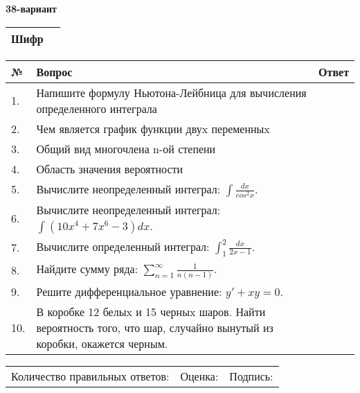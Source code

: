 \documentclass{article}
\begin{document}
  \egroup
  
  \newpage
  
  
  \textbf{38-вариант}\\
  
  \bgroup
  \def\arraystretch{1.6} %
  
  \begin{tabular}{|m{5.7cm}|m{9.5cm}|}
  \hline
  Шифр & \\
  \hline
  \end{tabular}
  
  \vspace{1cm}
  
  \begin{tabular}{|m{0.7cm}|m{10cm}|m{4cm}|}
  \hline
  № & Вопрос & Ответ \\
  \hline
  1. & Напишите формулу Ньютона-Лейбница для вычисления определенного интеграла &  \\
  \hline
  2. & Чем является график функции двуx переменныx &  \\
  \hline
  3. & Общий вид многочлена n-ой степени &  \\
  \hline
  4. & Область значения вероятности &  \\
  \hline
  5. & Вычислите неопределенный интеграл: \(\int\frac{dx}{cos^{2}x}\). &  \\
  \hline
  6. & Вычислите неопределенный интеграл: \(\int{\left( 10x^{4} + 7x^{6} - 3 \right)dx}\). &  \\
  \hline
  7. & Вычислите определенный интеграл: \(\int_{1}^{2}\frac{dx}{2x -1}\). &  \\
  \hline
  8. & Найдите сумму ряда: \(\sum_{n = 1}^{\infty}\frac{1}{n(n - 1)}\). &  \\
  \hline
  9. & Решите дифференциальное уравнение: \(y' + xy = 0\). &  \\
  \hline
  10. & В коробке 12 белыx и 15 черныx шаров. Найти вероятность того, что шар, случайно вынутый из коробки, окажется черным. &  \\
  \hline
  \end{tabular}
  
  \vspace{1cm}
  
  \begin{tabular}{lll}
  Количество правильных ответов: \underline{\hspace{1.5cm}} & 
  Оценка: \underline{\hspace{1.5cm}} & 
  Подпись: \underline{\hspace{2cm}} \\
  \end{tabular}
  
\end{document}
